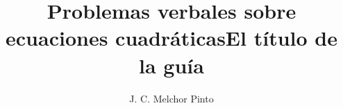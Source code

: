 \documentclass[12pt,addpoints,answers]{guia}
\title{Problemas verbales sobre ecuaciones cuadráticas}
\title{El título de la guía}
\author{J. C. Melchor Pinto}
\begin{document}
\pagestyle{headandfoot}

\INFO
\begin{multicols}{2}
    
\end{multicols}
\newpage
\begin{questions}
    
\end{questions}
\end{document}
